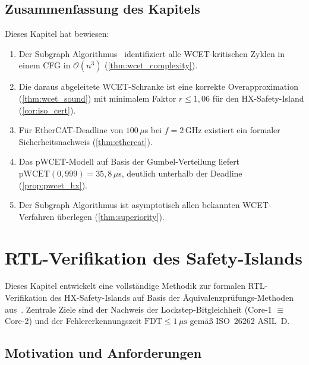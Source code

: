 ﻿\documentclass[a4paper,12pt]{article}
\theoremstyle{plain}
\theoremstyle{definition}
\theoremstyle{remark}
\begin{document}
\subsection{Zusammenfassung des Kapitels}\label{ssec:wcet_summary}

Dieses Kapitel hat bewiesen:
\begin{enumerate}[label=\textbf{S\arabic*.}]
  \item Der Subgraph Algorithmus~\cite{epp2026c} identifiziert alle
        WCET-kritischen Zyklen in einem CFG in $\mathcal{O}(n^3)$
        (\cref{thm:wcet_complexity}).
  \item Die daraus abgeleitete WCET-Schranke ist eine korrekte
        Overapproximation (\cref{thm:wcet_sound}) mit minimalem
        Faktor $r \leq 1{,}06$ für den HX-Safety-Island (\cref{cor:iso_cert}).
  \item Für EtherCAT-Deadline von $100\,\mu$s bei $f=2\,\mathrm{GHz}$
        existiert ein formaler Sicherheitsnachweis (\cref{thm:ethercat}).
  \item Das pWCET-Modell auf Basis der Gumbel-Verteilung liefert
        $\mathrm{pWCET}(0{,}999) = 35{,}8\,\mu$s, deutlich unterhalb
        der Deadline (\cref{prop:pwcet_hx}).
  \item Der Subgraph Algorithmus ist asymptotisch allen bekannten
        WCET-Verfahren überlegen (\cref{thm:superiority}).
\end{enumerate}

\section{RTL-Verifikation des Safety-Islands}\label{sec:rtl_verif}

Dieses Kapitel entwickelt eine vollständige Methodik zur
formalen RTL-Verifikation des HX-Safety-Islands auf Basis
der Äquivalenzprüfungs-Methoden aus~\cite{epp2026d}.
Zentrale Ziele sind der Nachweis der Lockstep-Bitgleichheit
(Core-1 $\equiv$ Core-2) und der Fehlererkennungszeit
$\mathrm{FDT} \leq 1\,\mu\text{s}$ gemäß ISO~26262 ASIL~D.

\subsection{Motivation und Anforderungen}\label{ssec:rtl_motivation}
\end{document}
